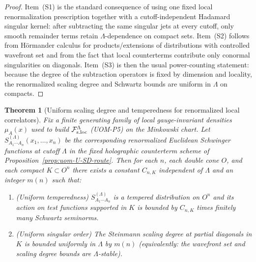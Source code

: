 \documentclass[10pt]{article}
\theoremstyle{definition}
\theoremstyle{plain}
\newtheorem{theorem}{Theorem}[section]
\begin{document}
\begin{proof}
Item~\textnormal{(S1)} is the standard consequence of using one fixed local renormalization prescription together with a cutoff-independent Hadamard
singular kernel: after subtracting the same singular jets at every cutoff, only smooth remainder terms retain $\Lambda$-dependence on compact sets.
Item~\textnormal{(S2)} follows from Hörmander calculus for products/extensions of distributions with controlled wavefront set and from the fact that local
counterterms contribute only conormal singularities on diagonals.  Item~\textnormal{(S3)} is then the usual power-counting statement: because the degree of
the subtraction operators is fixed by dimension and locality, the renormalized scaling degree and Schwartz bounds are uniform in $\Lambda$ on compacts.
\end{proof}

\begin{theorem}[Uniform scaling degree and temperedness for renormalized local correlators]
\label{thm:uom-U-SD}
Fix a finite generating family of local gauge-invariant densities $\mu_A(x)$ used to build
$\mathcal F_{\rm s.loc}^\Lambda$ (UOM-P5) on the Minkowski chart.  Let
$S^{(\Lambda)}_{A_1\cdots A_n}(x_1,\ldots,x_n)$ be the corresponding renormalized Euclidean
Schwinger functions at cutoff $\Lambda$ in the fixed holographic counterterm scheme of
Proposition~\ref{prop:uom-U-SD-route}.  Then for each $n$, each double cone $O$, and each compact
$K\subset O^n$ there exists a constant $C_{n,K}$ independent of $\Lambda$ and an integer $m(n)$ such that:
\begin{enumerate}[label=\textnormal{(\roman*)},leftmargin=2.2em,itemsep=1pt]
\item (\emph{Uniform temperedness}) $S^{(\Lambda)}_{A_1\cdots A_n}$ is a tempered distribution on $O^n$
and its action on test functions supported in $K$ is bounded by $C_{n,K}$ times finitely many Schwartz seminorms.
\item (\emph{Uniform singular order}) The Steinmann scaling degree at partial diagonals in $K$ is bounded
uniformly in $\Lambda$ by $m(n)$ (equivalently: the wavefront set and scaling degree bounds are $\Lambda$-stable).
\end{enumerate}
\end{theorem}
\end{document}
